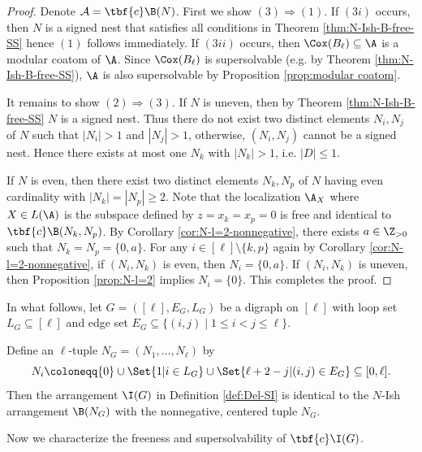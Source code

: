  
  \begin{proof}
Denote  $ \mathcal{A}=\tbf{c}\B(N)$.
First we show $(3) \Rightarrow (1)$.   
If  $(3i)$ occurs, then $N$ is a signed nest that satisfies all conditions in Theorem \ref{thm:N-Ish-B-free-SS} hence $(1)$ follows immediately. 
If  $(3ii)$ occurs, then $\Cox(B_\ell)\subseteq \A$ is a modular coatom of $\A$. 
Since $\Cox(B_\ell)$ is supersolvable (e.g. by Theorem \ref{thm:N-Ish-B-free-SS}), $\A$ is also supersolvable by Proposition \ref{prop:modular coatom}. 
  
It remains to show  $(2) \Rightarrow (3)$. 
If $N$ is uneven, then by Theorem \ref{thm:N-Ish-B-free-SS} $N$ is a signed nest.
Thus there do not exist two distinct elements $N_i, N_j$ of $N$ such that $| N_i|>1$ and $| N_j |>1$, otherwise, $(N_i, N_j)$ cannot be a signed nest. 
Hence there exists at most one  $N_k$ with $| N_k |>1$, i.e. $| D | \le 1 $.

If $N$ is even, then there exist two distinct elements $N_k, N_p$ of $N$ having even cardinality with $|N_k| = |N_p| \ge 2$. 
Note that the localization $\A_X$ where $X\in L(\A)$ is the subspace defined by $z=x_{k}=x_p=0$ is free and identical to $\tbf{c}\B(N_k, N_p)$. 
By Corollary \ref{cor:N-l=2-nonnegative}, there exists $a \in \Z_{>0}$ such that $N_k = N_p =\{0,a\}$.
For any $i \in [\ell]\setminus\{k,p\}$ again by Corollary \ref{cor:N-l=2-nonnegative}, if $(N_i, N_k)$ is even, then $N_i =\{0,a\}$. 
If $(N_i, N_k)$ is uneven, then Proposition \ref{prop:N-l=2} implies $N_i =\{0\}$. 
This completes the proof.
 \end{proof} 
 
 
 In what follows,  let $G=([\ell],E_G,L_G)$ be a digraph on $[\ell]$ with loop set  $L_G\subseteq[\ell]$ and edge set $E_G \subseteq \{(i,j) \mid 1 \leq i < j \leq \ell\}$.  
 
  \begin{remark}
 \label{rem:IG-NI}
Define an $\ell$-tuple $N_G=(N_1, \ldots, N_\ell)$ by 
$$N_i  \coloneqq  \{0\} \cup  \Set{ 1 | i \in L_G} \cup  \Set{ \ell+2-j | (i,j) \in E_G} \subseteq [0,\ell].$$
Then the arrangement $\I(G)$ in Definition \ref{def:Del-SI} is identical to the $N$-Ish arrangement $\B(N_G)$ with the nonnegative, centered tuple  $N_G$.
\end{remark}
 


Now we characterize the freeness and supersolvability of $\tbf{c}\I(G)$.
 
